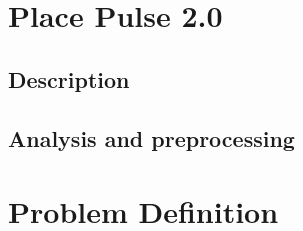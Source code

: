 \section{Place Pulse 2.0}
    \subsection{Description}

    \subsection{Analysis and preprocessing}


\section{Problem Definition}